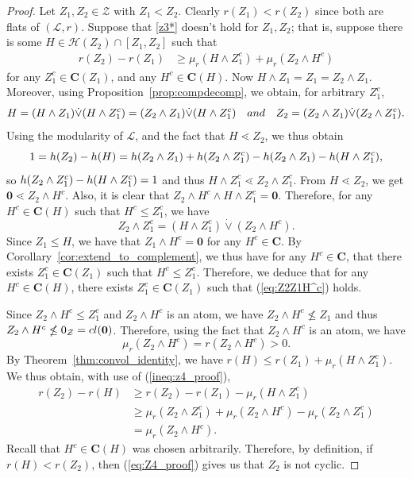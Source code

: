\documentclass[a4paper,11pt,reqno]{article}
\theoremstyle{definition}
\newcommand{\zero}{{\mathbf{0}}}
\begin{document}
\begin{proof}
        Let $Z_1,Z_2 \in \mathcal{Z}$ with $Z_1 < Z_2$. Clearly $r(Z_1)<r(Z_2)$ since both are flats of $(\mathcal{L},r)$.
        Suppose that \ref{z3*} doesn't hold for $Z_1,Z_2$; that is, suppose there is some $H\in\mathcal{H}(Z_2)\cap[Z_1,Z_2]$ such that
        \begin{align}\label{ineq:z4_proof}
            r(Z_2)-r(Z_1)&\geq\mu_r(H\wedge Z_1^c)+\mu_r(Z_2\wedge H^c) 
        \end{align}
        for any $Z_1^c\in\mathbf{C}(Z_1)$, and any $H^c\in\mathbf{C}(H)$. Now $H\wedge Z_1=Z_1=Z_2\wedge Z_1$.
        Moreover, using Proposition~\ref{prop:compdecomp}, we obtain, for arbitrary $Z_1^c$,
        $$H=(H\wedge Z_1)\dot\vee(H\wedge Z_1^c)=(Z_2\wedge Z_1)\dot\vee(H\wedge Z_1^c)\quad\textup{and}\quad Z_2=(Z_2\wedge Z_1)\dot\vee(Z_2\wedge Z_1^c).$$
        Using the modularity of $\mathcal{L}$, and the fact that $H\lessdot Z_2$, we thus obtain
        $$1=\textup{h}(Z_2)-\textup{h}(H)=\textup{h}(Z_2\wedge Z_1)+\textup{h}(Z_2\wedge Z_1^c)-\textup{h}(Z_2\wedge Z_1)-\textup{h}(H\wedge Z_1^c),$$ 
        so $\textup{h}(Z_2\wedge Z_1^c)-\textup{h}(H\wedge Z_1^c)=1$ and thus $H\wedge Z_1^c\lessdot Z_2\wedge Z_1^c.$ From $H\lessdot Z_2$, we get $\zero\lessdot Z_2\wedge H^c$. Also, it is clear that $Z_2\wedge H^c\wedge H\wedge Z_1^c=\zero$. Therefore, for any $H^c\in\mathbf{C}(H)$ such that $H^c\leq Z_1^c$, we have
        \begin{equation}\label{eq:Z2Z1H^c}
            Z_2\wedge Z_1^c=(H\wedge Z_1^c)\dot\vee(Z_2\wedge H^c).
        \end{equation}
        Since $Z_1\leq H$, we have that $Z_1\wedge H^c=\zero$ for any $H^c\in\mathbf{C}$. By Corollary~\ref{cor:extend_to_complement}, we thus have for any $H^c\in\mathbf{C}$, that there exists $Z_1^c\in\mathbf{C}(Z_1)$ such that $H^c\leq Z_1^c$. Therefore, we deduce that for any $H^c\in\mathbf{C}(H)$, there exists $Z_1^c\in\mathbf{C}(Z_1)$ such that (\ref{eq:Z2Z1H^c}) holds.

        Since $Z_2\wedge H^c\leq Z_1^c$ and $Z_2\wedge H^c$ is an atom, we have $Z_2\wedge H^c\nleq Z_1$ and thus $Z_2\wedge H^c\nleq 0_\mathcal{Z}=\textup{cl}(\zero)$. Therefore, using the fact that $Z_2\wedge H^c$ is an atom, we have
        $$\mu_r(Z_2\wedge H^c)=r(Z_2\wedge H^c)>0.$$ 
        By Theorem~\ref{thm:convol_identity}, we have $r(H)\leq r(Z_1)+\mu_r(H\wedge Z_1^c)$. We thus obtain, with use of (\ref{ineq:z4_proof}),
        \begin{align}
            r(Z_2)-r(H)&\geq r(Z_2)-r(Z_1)-\mu_r(H\wedge Z_1^c)\nonumber\\
            &\geq\mu_r(Z_2\wedge Z_1^c)+\mu_r(Z_2\wedge H^c)-\mu_r(Z_2\wedge Z_1^c)\nonumber\\
            &=\mu_r(Z_2\wedge H^c).\label{eq:Z4_proof}
        \end{align}
        Recall that $H^c\in\mathbf{C}(H)$ was chosen arbitrarily. Therefore, by definition, if $r(H)<r(Z_2)$, then (\ref{eq:Z4_proof}) gives us that $Z_2$ is not cyclic.


\end{proof}
\end{document}
